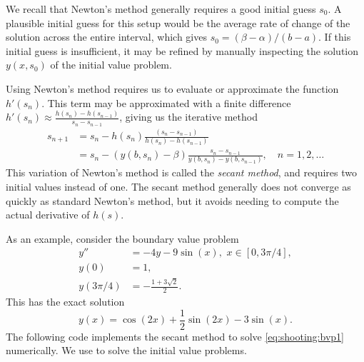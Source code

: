 We recall that Newton's method generally requires a good initial guess $s_0$.
A plausible initial guess for this setup would be the average rate of change of the solution across the entire interval, which gives $s_0 =  (\beta - \alpha)/(b-a)$.
If this initial guess is insufficient, it may be refined by manually inspecting the solution $y(x,s_0)$ of the initial value problem.

Using Newton's method requires us to evaluate or approximate the function $h'(s_n)$.
This term may be approximated with a finite difference \(h'(s_n)\approx \frac{h(s_n)-h(s_{n-1})}{s_n-s_{n-1}}\), giving us the iterative method
\begin{align*}
s_{n+1} &= s_n - h(s_n)\frac{ (s_n - s_{n-1})}{h(s_n)-h(s_{n-1}) }
\\
&= s_n - (y(b,s_n) - \beta)\frac{s_n-s_{n-1}}{y(b,s_n) - y(b,s_{n-1})},
\quad n = 1, 2,\hdots
\end{align*}
This variation of Newton's method is called the \textit{secant method}, and requires two initial values instead of one.
The secant method generally does not converge as quickly as standard Newton's method, but it avoids needing to compute the actual derivative of \(h(s)\).

As an example, consider the boundary value problem
\begin{equation}
\begin{split}
\label{eq:shooting:bvp1}
y'' &= -4y -9\sin(x), \,\, x \in [0,3\pi/4],\\
y(0) &= 1, \\
y(3 \pi/4) &= -\frac{1+3\sqrt{2}}{2}.
\end{split}
\end{equation}
This has the exact solution
\[
y(x)=\cos(2x)+\frac{1}{2}\sin(2x)-3\sin(x).
\]
The following code implements the secant method to solve \eqref{eq:shooting:bvp1} numerically.
We use  to solve the initial value problems.

